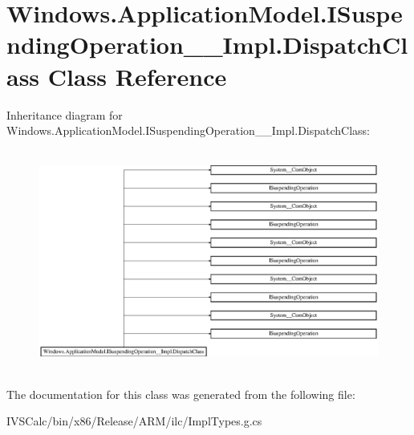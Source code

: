 \hypertarget{class_windows_1_1_application_model_1_1_i_suspending_operation_____impl_1_1_dispatch_class}{}\section{Windows.\+Application\+Model.\+I\+Suspending\+Operation\+\_\+\+\_\+\+Impl.\+Dispatch\+Class Class Reference}
\label{class_windows_1_1_application_model_1_1_i_suspending_operation_____impl_1_1_dispatch_class}
Inheritance diagram for Windows.\+Application\+Model.\+I\+Suspending\+Operation\+\_\+\+\_\+\+Impl.\+Dispatch\+Class\+:\begin{figure}[H]
\begin{center}
\leavevmode
\includegraphics[height=7.315915cm]{class_windows_1_1_application_model_1_1_i_suspending_operation_____impl_1_1_dispatch_class}
\end{center}
\end{figure}


The documentation for this class was generated from the following file\+:\begin{DoxyCompactItemize}
\item 
I\+V\+S\+Calc/bin/x86/\+Release/\+A\+R\+M/ilc/Impl\+Types.\+g.\+cs\end{DoxyCompactItemize}
